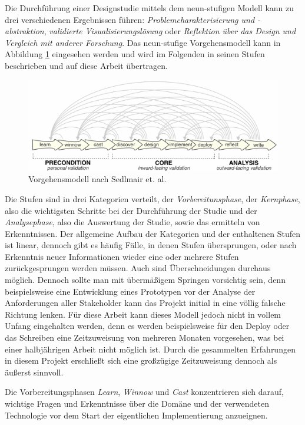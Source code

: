 \documentclass[
  ngerman,
  a4paper,  %
  twoside,  %
  bibliography=totoc,
  headsepline,
  cleardoublepage=empty,
  parskip=half,
  draft=false
]{scrbook}
\begin{document}
Die Durchführung einer Designstudie mittels dem neun-stufigen Modell kann zu drei verschiedenen Ergebnissen führen: \textit{Problemcharakterisierung und -abstraktion}, \textit{validierte Visualisierungslösung} oder \textit{Reflektion über das Design und Vergleich mit anderer Forschung}. Das neun-stufige Vorgehensmodell kann in Abbildung \ref{fig:vorgehensmodell} eingesehen werden und wird im Folgenden in seinen Stufen beschrieben und auf diese Arbeit übertragen.

\begin{figure}
  \includegraphics[width=\textwidth]{graphics/vorgehensmodell.png}
  \caption{Vorgehensmodell nach Sedlmair et. al. \cite{sedlmair_design_2012}}
  \label{fig:vorgehensmodell}
\end{figure}

Die Stufen sind in drei Kategorien verteilt, der \textit{Vorbereitunsphase}, der \textit{Kernphase}, also die wichtigsten Schritte bei der Durchführung der Studie und der \textit{Analysephase}, also die Auswertung der Studie, sowie das ermitteln von Erkenntnissen. Der allgemeine Aufbau der Kategorien und der enthaltenen Stufen ist linear, dennoch gibt es häufig Fälle, in denen Stufen übersprungen, oder nach Erkenntnis neuer Informationen wieder eine oder mehrere Stufen zurückgesprungen werden müssen. Auch sind Überschneidungen durchaus möglich. Dennoch sollte man mit übermäßigem Springen vorsichtig sein, denn beispielsweise eine Entwicklung eines Prototypen vor der Analyse der Anforderungen aller Stakeholder kann das Projekt initial in eine völlig falsche Richtung lenken. Für diese Arbeit kann dieses Modell jedoch nicht in vollem Unfang eingehalten werden, denn es werden beispielsweise für den Deploy oder das Schreiben eine Zeitzuweisung von mehreren Monaten vorgesehen, was bei einer halbjährigen Arbeit nicht möglich ist. Durch die gesammelten Erfahrungen in diesem Projekt erschließt sich eine großzügige Zeitzuweisung dennoch als äußerst sinnvoll.

Die Vorbereitungsphasen \textit{Learn}, \textit{Winnow} und \textit{Cast} konzentrieren sich darauf, wichtige Fragen und Erkenntnisse über die Domäne und der verwendeten Technologie vor dem Start der eigentlichen Implementierung anzueignen.
\end{document}
